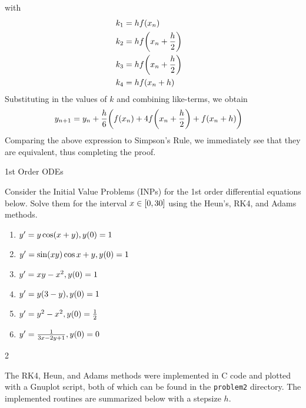 \documentclass[12pt]{article}
\newenvironment{ex}[2][Exercise]{\begin{trivlist}
\item[\hskip \labelsep {\bfseries #1}\hskip \labelsep {\bfseries #2.}]}{\end{trivlist}}
\newenvironment{sol}[1][Solution]{\begin{trivlist}
\item[\hskip \labelsep {\bfseries #1:}]}{\end{trivlist}}
\DeclarePairedDelimiter\rb{(}{)}
\DeclarePairedDelimiter\sqrb{[}{]}
\begin{document}
\begin{enumerate}[label=(\alph*)]
        with
        \begin{align*}
            k_{1} & =  h f \rb*{x_{n}} &\\
            k_{2} & =  h f \rb*{x_{n} + \frac{h}{2}} &\\
            k_{3} & =  h f \rb*{x_{n} + \frac{h}{2}} &\\
            k_{4} & =  h f \rb*{ x_{n} + h} &\\
        \end{align*}
        Substituting in the values of \(k\) and combining like-terms, we obtain
        \begin{align*}
            y_{n+1} & =  y_{n} + \frac{h}{6} \rb*{ f \rb*{x_{n}}
            + 4 f \rb*{x_{n} + \frac{h}{2}} + f \rb*{x_{n} + h}} &\\
        \end{align*}
        Comparing the above expression to Simpson's Rule, we immediately see that they are equivalent, thus completing the proof.
\end{enumerate}

\newpage

\begin{ex}
    2 1st Order ODEs
\end{ex}

Consider the Initial Value Problems (INPs) for the 1st order differential equations below. Solve them for the interval \(x \in \sqrb*{0,30}\) using the Heun's, RK4, and Adams methods. 

\begin{enumerate}[label=(\alph*)]
    \item \(y' = y \cos \rb*{x + y}, y \rb*{0} = 1 \)
    \item \(y' = \sin \rb*{xy} \cos x + y  , y \rb*{0} = 1\)
    \item \(y' = xy - x^{2}, y \rb*{0} = 1\)
    \item \(y' = y \rb*{3 - y}, y \rb*{0} = 1\)
    \item \(y' = y^{2} - x^{2}, y\rb*{0} = \frac{1}{2}\)
    \item \(y' = \frac{1}{3x - 2y + 1}, y\rb*{0} = 0\)
\end{enumerate}


\begin{sol} 2 \end{sol}

The RK4, Heun, and Adams methods were implemented in C code and plotted with a Gnuplot script, both of which can be found in the \texttt{problem2} directory. The implemented routines are summarized below with a stepsize \(h\).
\end{document}
